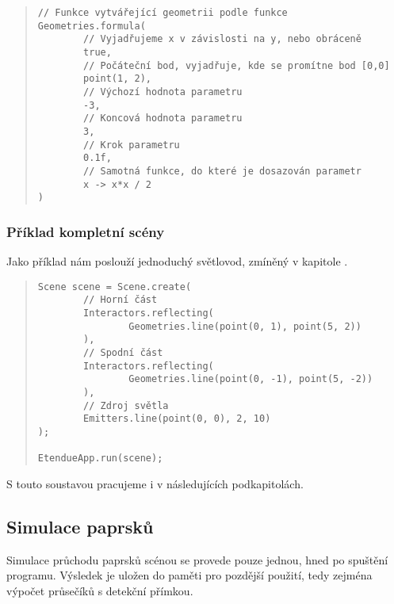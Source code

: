 \begin{minipage}{\textwidth}\begin{quote}\begin{lstlisting}
// Funkce vytvářející geometrii podle funkce
Geometries.formula(
        // Vyjadřujeme x v závislosti na y, nebo obráceně
        true,
        // Počáteční bod, vyjadřuje, kde se promítne bod [0,0]
        point(1, 2),
        // Výchozí hodnota parametru
        -3,
        // Koncová hodnota parametru
        3,
        // Krok parametru
        0.1f,
        // Samotná funkce, do které je dosazován parametr
        x -> x*x / 2
)
\end{lstlisting}\end{quote}\end{minipage}


\subsubsection{Příklad kompletní scény}

Jako příklad nám poslouží jednoduchý světlovod, zmíněný v kapitole .

\begin{minipage}{\textwidth}\begin{quote}\begin{lstlisting}
Scene scene = Scene.create(
        // Horní část
        Interactors.reflecting(
                Geometries.line(point(0, 1), point(5, 2))
        ),
        // Spodní část
        Interactors.reflecting(
                Geometries.line(point(0, -1), point(5, -2))
        ),
        // Zdroj světla
        Emitters.line(point(0, 0), 2, 10)
);

EtendueApp.run(scene);
\end{lstlisting}\end{quote}\end{minipage}

S touto soustavou pracujeme i v následujících podkapitolách.


\subsection{Simulace paprsků}
\label{sub:architekturaaplikace_simulacepaprsku}

Simulace průchodu paprsků scénou se provede pouze jednou, hned po spuštění programu. Výsledek je uložen do paměti pro pozdější použití, tedy zejména výpočet průsečíků s detekční přímkou.


